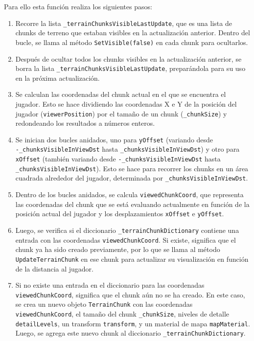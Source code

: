 Para ello esta función realiza los siguientes pasos:

\begin{enumerate}
    \item Recorre la lista \texttt{\_terrainChunksVisibleLastUpdate}, que es una lista de chunks de terreno que estaban visibles en la actualización anterior. Dentro del bucle, se llama al método \texttt{SetVisible(false)} en cada chunk para ocultarlos.
    \item Después de ocultar todos los chunks visibles en la actualización anterior, se borra la lista \texttt{\_terrainChunksVisibleLastUpdate}, preparándola para su uso en la próxima actualización.
    \item Se calculan las coordenadas del chunk actual en el que se encuentra el jugador. Esto se hace dividiendo las coordenadas X e Y de la posición del jugador (\texttt{viewerPosition}) por el tamaño de un chunk (\texttt{\_chunkSize}) y redondeando los resultados a números enteros.
    \item Se inician dos bucles anidados, uno para \texttt{yOffset} (variando desde \\\texttt{-\_chunksVisibleInViewDst} hasta \texttt{\_chunksVisibleInViewDst}) y otro para \texttt{xOffset} (también variando desde \texttt{-\_chunksVisibleInViewDst} hasta \texttt{\_chunksVisibleInViewDst}). Esto se hace para recorrer los chunks en un área cuadrada alrededor del jugador, determinada por \texttt{\_chunksVisibleInViewDst}.
    \item Dentro de los bucles anidados, se calcula \texttt{viewedChunkCoord}, que representa las coordenadas del chunk que se está evaluando actualmente en función de la posición actual del jugador y los desplazamientos \texttt{xOffset} e \texttt{yOffset}.
    \item Luego, se verifica si el diccionario \texttt{\_terrainChunkDictionary} contiene una entrada con las coordenadas \texttt{viewedChunkCoord}. Si existe, significa que el chunk ya ha sido creado previamente, por lo que se llama al método \texttt{UpdateTerrainChunk} en ese chunk para actualizar su visualización en función de la distancia al jugador.
    \item Si no existe una entrada en el diccionario para las coordenadas \texttt{viewedChunkCoord}, significa que el chunk aún no se ha creado. En este caso, se crea un nuevo objeto \texttt{TerrainChunk} con las coordenadas \texttt{viewedChunkCoord}, el tamaño del chunk \texttt{\_chunkSize}, niveles de detalle \texttt{detailLevels}, un transform \texttt{transform}, y un material de mapa \texttt{mapMaterial}. Luego, se agrega este nuevo chunk al diccionario \texttt{\_terrainChunkDictionary}.
\end{enumerate}

